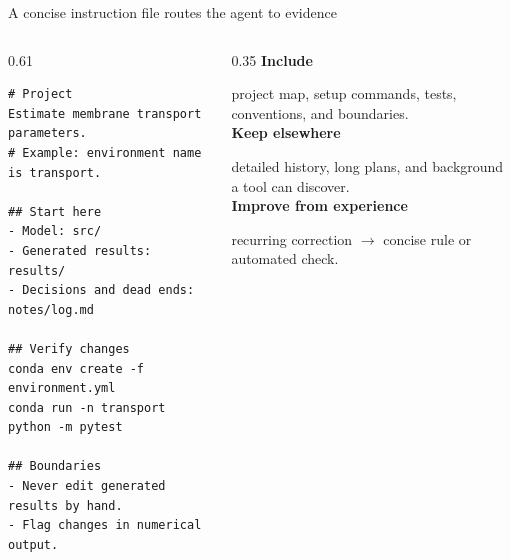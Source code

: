 \begin{frame}[fragile]{A concise instruction file routes the agent to evidence}
  \vfill
  \begin{columns}[c]
    \begin{column}{0.61\textwidth}
      \begin{lstlisting}[basicstyle=\ttfamily\scriptsize]
# Project
Estimate membrane transport parameters.
# Example: environment name is transport.

## Start here
- Model: src/
- Generated results: results/
- Decisions and dead ends: notes/log.md

## Verify changes
conda env create -f environment.yml
conda run -n transport python -m pytest

## Boundaries
- Never edit generated results by hand.
- Flag changes in numerical output.
      \end{lstlisting}
    \end{column}
    \begin{column}{0.35\textwidth}
      \small
      \textbf{Include}\par
      project map, setup commands, tests, conventions, and boundaries.\\[0.7em]
      \textbf{Keep elsewhere}\par
      detailed history, long plans, and background a tool can discover.\\[0.7em]
      \textbf{Improve from experience}\par
      recurring correction $\rightarrow$ concise rule or automated check.
    \end{column}
  \end{columns}
  \vspace{1.0cm plus 1fill}
\end{frame}


